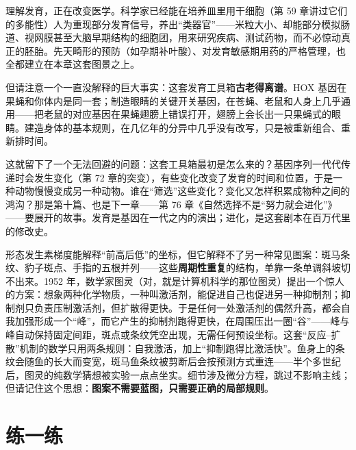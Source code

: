 理解发育，正在改变医学。科学家已经能在培养皿里用干细胞（第 59 章讲过它们的多能性）人为重现部分发育信号，养出“类器官”——米粒大小、却能部分模拟肠道、视网膜甚至大脑早期结构的细胞团，用来研究疾病、测试药物，而不必惊动真正的胚胎。先天畸形的预防（如孕期补叶酸）、对发育敏感期用药的严格管理，也全都建立在本章这套图景之上。

但请注意一个一直没解释的巨大事实：这套发育工具箱\textbf{古老得离谱}。HOX 基因在果蝇和你体内是同一套；制造眼睛的关键开关基因，在苍蝇、老鼠和人身上几乎通用——把老鼠的对应基因在果蝇翅膀上错误打开，翅膀上会长出一只果蝇式的眼睛。建造身体的基本规则，在几亿年的分异中几乎没有改写，只是被重新组合、重新排时间。

这就留下了一个无法回避的问题：这套工具箱最初是怎么来的？基因序列一代代传递时会发生变化（第 72 章的突变），有些变化改变了发育的时间和位置，于是一种动物慢慢变成另一种动物。谁在“筛选”这些变化？变化又怎样积累成物种之间的鸿沟？那是第十篇、也是下一章——第 76 章《自然选择不是“努力就会进化”》——要展开的故事。发育是基因在一代之内的演出；进化，是这套剧本在百万代里的修改史。

\begin{tiaozhan}
形态发生素梯度能解释“前高后低”的坐标，但它解释不了另一种常见图案：斑马条纹、豹子斑点、手指的五根并列——这些\textbf{周期性重复}的结构，单靠一条单调斜坡切不出来。1952 年，数学家图灵（对，就是计算机科学的那位图灵）提出一个惊人的方案：想象两种化学物质，一种叫激活剂，能促进自己也促进另一种抑制剂；抑制剂只负责压制激活剂，但扩散得更快。于是任何一处激活剂的偶然升高，都会自我加强形成一个“峰”，而它产生的抑制剂跑得更快，在周围压出一圈“谷”——峰与峰自动保持固定间距，斑点或条纹凭空出现，无需任何预设坐标。这套“反应–扩散”机制的数学只用两条规则：自我激活，加上“抑制跑得比激活快”。鱼身上的条纹会随鱼的长大而变宽，斑马鱼条纹被剪断后会按预测方式重连——半个多世纪后，图灵的纯数学猜想被实验一点点坐实。细节涉及微分方程，跳过不影响主线；但请记住这个思想：\textbf{图案不需要蓝图，只需要正确的局部规则}。
\end{tiaozhan}

\section*{练一练}

